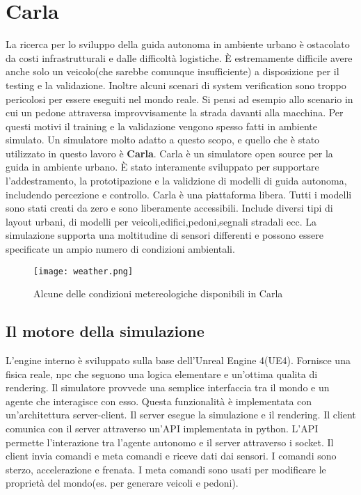 \section{Carla}\cite{carla}
La ricerca per lo sviluppo della guida autonoma in ambiente urbano è  ostacolato da costi infrastrutturali e dalle difficoltà logistiche. È
estremamente difficile avere anche solo un veicolo(che sarebbe comunque insufficiente) a disposizione per il testing e la validazione. Inoltre
alcuni scenari di system verification sono troppo pericolosi per essere eseguiti nel mondo reale. Si pensi ad esempio allo scenario in cui
un pedone attraversa improvvisamente la strada davanti alla macchina. Per questi motivi il training e la validazione vengono spesso fatti in ambiente simulato.  Un simulatore molto adatto a questo scopo, e quello che è stato utilizzato in questo lavoro
è \textbf{Carla}. Carla è un simulatore open source per la guida in ambiente urbano. È stato interamente sviluppato per supportare l'addestramento, la prototipazione
e la validzione di modelli di guida autonoma, includendo percezione e controllo. Carla è una piattaforma libera. Tutti i modelli sono stati creati da zero
e sono liberamente accessibili. Include diversi tipi di layout urbani, di modelli per veicoli,edifici,pedoni,segnali stradali ecc.
La simulazione supporta una moltitudine di sensori differenti e possono essere specificate un ampio numero di condizioni ambientali.
\begin{figure}[h]
    \texttt{[image: weather.png]}
    \caption{Alcune delle condizioni metereologiche disponibili in Carla}
    \label{fig:weath}
\end{figure}

\subsection{Il motore della simulazione}
L'engine interno è sviluppato sulla base dell'Unreal Engine 4(UE4). Fornisce una fisica reale, npc che seguono una logica elementare e un'ottima qualita di rendering.
Il simulatore provvede una semplice interfaccia tra il mondo e un agente che interagisce con esso. Questa funzionalità è implementata con un'architettura server-client.
Il server esegue la simulazione e il rendering. Il client comunica con il server attraverso un'API implementata in python. L'API permette l'interazione tra l'agente autonomo e il server
attraverso i socket. Il client invia comandi e meta comandi e riceve dati dai sensori. I comandi sono sterzo, accelerazione e frenata. I meta comandi sono usati per modificare le proprietà
del mondo(es. per generare veicoli e pedoni).
